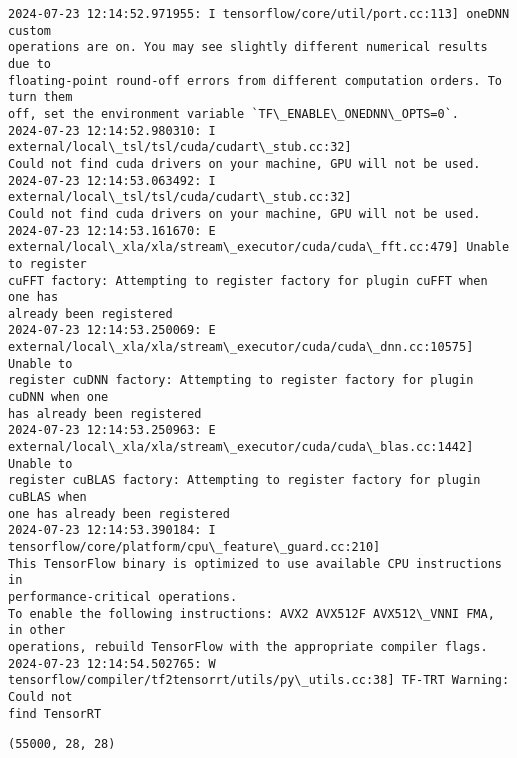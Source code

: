 \documentclass[12pt letter]{report}
\makeatletter
\newcommand{\boxspacing}{\kern\kvtcb@left@rule\kern\kvtcb@boxsep}
\newcommand{\prompt}[4]{
        {\ttfamily\llap{{\color{#2}[#3]:\hspace{3pt}#4}}\vspace{-\baselineskip}}
    }
\makeatother
\begin{document}
    \begin{Verbatim}[commandchars=\\\{\}]
2024-07-23 12:14:52.971955: I tensorflow/core/util/port.cc:113] oneDNN custom
operations are on. You may see slightly different numerical results due to
floating-point round-off errors from different computation orders. To turn them
off, set the environment variable `TF\_ENABLE\_ONEDNN\_OPTS=0`.
2024-07-23 12:14:52.980310: I external/local\_tsl/tsl/cuda/cudart\_stub.cc:32]
Could not find cuda drivers on your machine, GPU will not be used.
2024-07-23 12:14:53.063492: I external/local\_tsl/tsl/cuda/cudart\_stub.cc:32]
Could not find cuda drivers on your machine, GPU will not be used.
2024-07-23 12:14:53.161670: E
external/local\_xla/xla/stream\_executor/cuda/cuda\_fft.cc:479] Unable to register
cuFFT factory: Attempting to register factory for plugin cuFFT when one has
already been registered
2024-07-23 12:14:53.250069: E
external/local\_xla/xla/stream\_executor/cuda/cuda\_dnn.cc:10575] Unable to
register cuDNN factory: Attempting to register factory for plugin cuDNN when one
has already been registered
2024-07-23 12:14:53.250963: E
external/local\_xla/xla/stream\_executor/cuda/cuda\_blas.cc:1442] Unable to
register cuBLAS factory: Attempting to register factory for plugin cuBLAS when
one has already been registered
2024-07-23 12:14:53.390184: I tensorflow/core/platform/cpu\_feature\_guard.cc:210]
This TensorFlow binary is optimized to use available CPU instructions in
performance-critical operations.
To enable the following instructions: AVX2 AVX512F AVX512\_VNNI FMA, in other
operations, rebuild TensorFlow with the appropriate compiler flags.
2024-07-23 12:14:54.502765: W
tensorflow/compiler/tf2tensorrt/utils/py\_utils.cc:38] TF-TRT Warning: Could not
find TensorRT
    \end{Verbatim}

            \begin{tcolorbox}[breakable, size=fbox, boxrule=.5pt, pad at break*=1mm, opacityfill=0]
\prompt{Out}{outcolor}{7}{\boxspacing}
\begin{Verbatim}[commandchars=\\\{\}]
(55000, 28, 28)
\end{Verbatim}
\end{tcolorbox}
        
\end{document}
